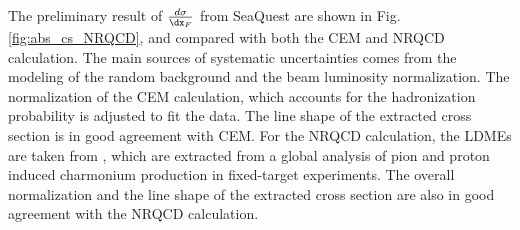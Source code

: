 \documentclass[10pt, a4paper,final]{article}
\begin{document}
The preliminary result of $\frac{d\sigma}{\dx_F}$ from SeaQuest are shown in
Fig.\ref{fig:abs_cs_NRQCD}, and compared with both the CEM and NRQCD calculation.
The main sources of systematic uncertainties comes from the modeling of the random background
and the beam luminosity normalization. The normalization of the CEM calculation,
which accounts for the hadronization probability is adjusted to fit the data. The line
shape of the extracted cross section is in good agreement with CEM. For the NRQCD
calculation, the LDMEs are taken from \cite{hsieh2021}, which are extracted from
a global analysis of pion and proton induced charmonium production in fixed-target
experiments. The overall normalization and the line shape of the extracted cross
section are also in good agreement with the NRQCD calculation.
\end{document}
